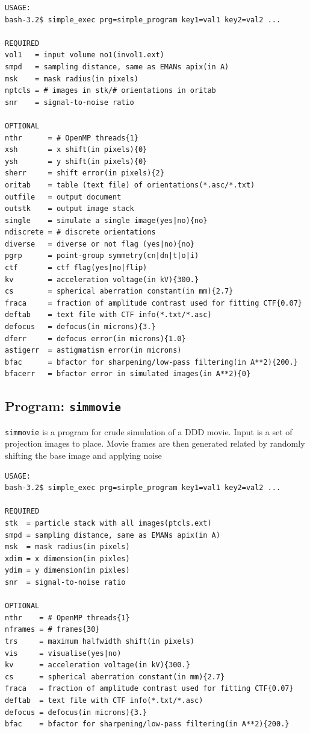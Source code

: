 \documentclass[a4paper,11pt]{article}
\newcommand{\prgname}[1]{\textcolor{NavyBlue}{\texttt{#1}}}
\begin{document}
\begin{verbatim}
USAGE:
bash-3.2$ simple_exec prg=simple_program key1=val1 key2=val2 ...

REQUIRED
vol1   = input volume no1(invol1.ext)
smpd   = sampling distance, same as EMANs apix(in A)
msk    = mask radius(in pixels)
nptcls = # images in stk/# orientations in oritab
snr    = signal-to-noise ratio

OPTIONAL
nthr      = # OpenMP threads{1}
xsh       = x shift(in pixels){0}
ysh       = y shift(in pixels){0}
sherr     = shift error(in pixels){2}
oritab    = table (text file) of orientations(*.asc/*.txt)
outfile   = output document
outstk    = output image stack
single    = simulate a single image(yes|no){no}
ndiscrete = # discrete orientations
diverse   = diverse or not flag (yes|no){no}
pgrp      = point-group symmetry(cn|dn|t|o|i)
ctf       = ctf flag(yes|no|flip)
kv        = acceleration voltage(in kV){300.}
cs        = spherical aberration constant(in mm){2.7}
fraca     = fraction of amplitude contrast used for fitting CTF{0.07}
deftab    = text file with CTF info(*.txt/*.asc)
defocus   = defocus(in microns){3.}
dferr     = defocus error(in microns){1.0}
astigerr  = astigmatism error(in microns)
bfac      = bfactor for sharpening/low-pass filtering(in A**2){200.}
bfacerr   = bfactor error in simulated images(in A**2){0}
\end{verbatim}

\subsection{Program: \prgname{simmovie}}
\label{simmovie}
\prgname{simmovie} is a program for crude simulation of a DDD movie. Input is a set of projection images to place. Movie frames are then generated related by randomly shifting the base image and applying noise

\begin{verbatim}
USAGE:
bash-3.2$ simple_exec prg=simple_program key1=val1 key2=val2 ...

REQUIRED
stk  = particle stack with all images(ptcls.ext)
smpd = sampling distance, same as EMANs apix(in A)
msk  = mask radius(in pixels)
xdim = x dimension(in pixles)
ydim = y dimension(in pixles)
snr  = signal-to-noise ratio

OPTIONAL
nthr    = # OpenMP threads{1}
nframes = # frames{30}
trs     = maximum halfwidth shift(in pixels)
vis     = visualise(yes|no)
kv      = acceleration voltage(in kV){300.}
cs      = spherical aberration constant(in mm){2.7}
fraca   = fraction of amplitude contrast used for fitting CTF{0.07}
deftab  = text file with CTF info(*.txt/*.asc)
defocus = defocus(in microns){3.}
bfac    = bfactor for sharpening/low-pass filtering(in A**2){200.}
\end{verbatim}
\end{document}
